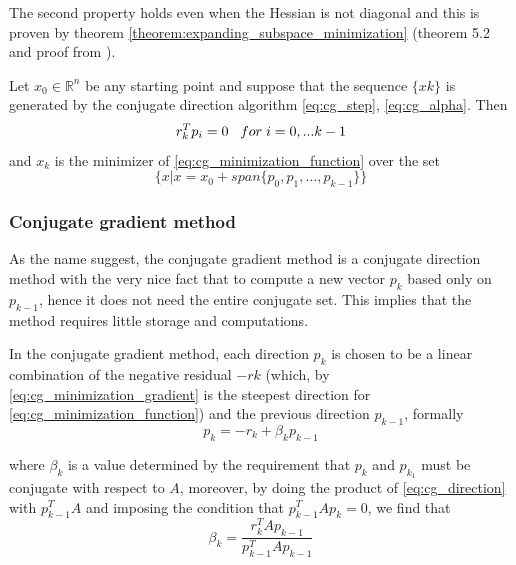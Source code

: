 \noindent The second property holds even when the Hessian is not diagonal and this is proven by theorem \ref{theorem:expanding_subspace_minimization} (theorem 5.2 and proof from \cite{nocedal1999numerical}).
\begin{theorem}
    Let $x_0 \in \mathbb{R}^n$ be any starting point and suppose that the sequence $\{ xk \}$ is generated by the conjugate direction algorithm \eqref{eq:cg_step}, \eqref{eq:cg_alpha}. Then
    \begin{equation}
        r_k^Tp_i = 0 \hspace{3mm} for \hspace{1mm} i=0,...k-1
        \label{eq:cg_residual_direction}
    \end{equation}
    and $x_k$ is the minimizer of \eqref{eq:cg_minimization_function} over the set
    \begin{equation}
        \{x | x = x_0 +span\{ p_0, p_1,\dots, p_{k-1}\} \}
    \end{equation}
    \label{theorem:expanding_subspace_minimization}
\end{theorem}

\subsubsection{Conjugate gradient method}
As the name suggest, the conjugate gradient method is a conjugate direction method with the very nice fact that to compute a new vector $p_k$ based only on $p_{k-1}$, hence it does not need the entire conjugate set. This implies that the method requires little storage and computations.
\vspace{3mm}

\noindent In the conjugate gradient method, each direction $p_k$ is chosen to be a linear combination of the negative residual $-rk$ (which, by \eqref{eq:cg_minimization_gradient} is the steepest direction for \eqref{eq:cg_minimization_function}) and the previous direction $p_{k-1}$, formally
\begin{equation}
    p_k = -r_k + \beta_kp_{k-1}
    \label{eq:cg_direction}
\end{equation}

\noindent where $\beta_k$ is a value determined by the requirement that $p_k$ and $p_{k_1}$ must be conjugate with respect to $A$, moreover, by doing the product of \eqref{eq:cg_direction} with $p^T_{k-1}A$ and imposing the condition that $p^T_{k-1}Ap_k=0$, we find that
\begin{equation}
    \beta_k = \frac{r^T_kAp_{k-1}}{p^T_{k-1}Ap_{k-1}}
    \label{eq:cg_beta}
\end{equation}

